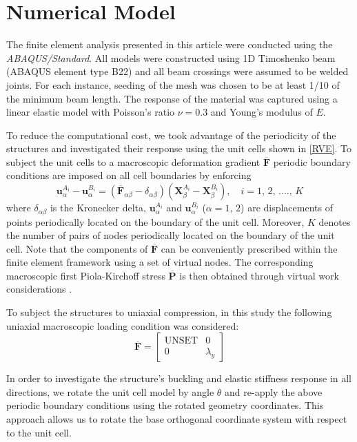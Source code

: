 \documentclass[10pt,twoside]{fernandes_supp}
\begin{document}
\section{Numerical Model}
The finite element analysis presented in this article were conducted using the {\it ABAQUS/Standard}. All models were constructed using 1D Timoshenko beam  (ABAQUS element type B22) and all beam crossings were assumed to be welded joints. For each instance, seeding of the mesh was chosen to be at least 1/10 of the minimum beam length. The response of the material was captured using a linear elastic model with  Poisson's ratio $\nu=0.3$ and  Young's modulus of $E$.


To reduce the computational cost, we took advantage of the periodicity of the structures and investigated their response  using  the unit cells shown  in \cref{RVE}.
To subject the unit cells to a macroscopic deformation gradient $\overline{\mathbf{F}}$ periodic boundary conditions are imposed on all cell boundaries by enforcing  \citep{danielsson2002, bertoldi2008}
\begin{equation} \label{EQN:DefInfPeriodicFEM}
    \mathbf{u}_\alpha^{A_i} -\mathbf{u}_\alpha^{B_i} = (\mathbf{\overline{F}}_{\alpha\beta}-\delta_{\alpha\beta})(\mathbf{X}_\beta^{A_i}-\mathbf{X}_\beta^{B_i}), \quad i=1,\,2,\,....,\,K
\end{equation}
where $\delta_{\alpha\beta}$ is the Kronecker delta, $\mathbf{u}_\alpha^{A_i}$  and $\mathbf{u}_\alpha^{B_i}$ ($\alpha=1,\,2$) are displacements of points periodically located on the boundary of the unit cell. Moreover, $K$ denotes the number of pairs of nodes periodically located on the boundary of the unit cell.  Note that  the components of $\overline{\mathbf{F}}$ can be conveniently prescribed within the finite element framework using a set of virtual nodes. The corresponding  macroscopic first Piola-Kirchoff stress $\overline{\mathbf{P}}$ is then obtained through virtual work considerations \citep{danielsson2002, bertoldi2008}. 

To subject the structures to uniaxial compression, in this study the following uniaxial macroscopic loading condition was considered: \begin{equation}
\overline{\mathbf{F}} = \begin{bmatrix}
\text{UNSET}&0\\
0&\lambda_y
\end{bmatrix} 
\end{equation}

In order to investigate the structure's buckling and elastic stiffness response in all directions, we rotate the unit cell model by angle $\theta$ and re-apply the above periodic boundary conditions using the rotated geometry coordinates. This approach allows us to rotate the base orthogonal coordinate system with respect to the unit cell. 
\end{document}

